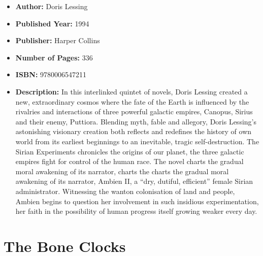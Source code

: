 \documentclass{tufte-handout}
\begin{document}
\begin{itemize}
    \item[] \textbf{Author:} Doris Lessing
    \item[] \textbf{Published Year:} 1994  
    \item[] \textbf{Publisher:} Harper Collins
    \item[] \textbf{Number of Pages:} 336      
    \item[] \textbf{ISBN:} 9780006547211
    \item[] \textbf{Description:} In this interlinked quintet of novels, Doris Lessing created a new, extraordinary cosmos where the fate of the Earth is influenced by the rivalries and interactions of three powerful galactic empires, Canopus, Sirius and their enemy, Puttiora. Blending myth, fable and allegory, Doris Lessing's astonishing visionary creation both reflects and redefines the history of own world from its earliest beginnings to an inevitable, tragic self-destruction. The Sirian Experiments chronicles the origins of our planet, the three galactic empires fight for control of the human race. The novel charts the gradual moral awakening of its narrator, charts the charts the gradual moral awakening of its narrator, Ambien II, a ``dry, dutiful, efficient'' female Sirian administrator. Witnessing the wanton colonisation of land and people, Ambien begins to question her involvement in such insidious experimentation, her faith in the possibility of human progress itself growing weaker every day.
\end{itemize}

\section*{The Bone Clocks}
\end{document}
